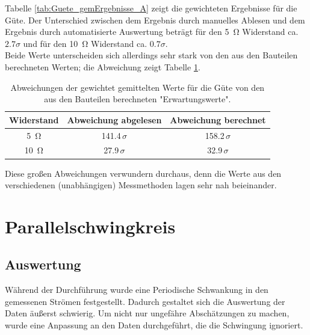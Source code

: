 \documentclass[12pt,a4paper]{article}
\begin{document}
Tabelle \ref{tab:Guete_gemErgebnisse_A} zeigt die gewichteten Ergebnisse für die Güte. Der Unterschied zwischen dem Ergebnis durch manuelles Ablesen und dem Ergebnis durch automatisierte Auswertung beträgt für den \SI{5}{\ohm} Widerstand ca. $2.7 \sigma$ und für den \SI{10}{\ohm} Widerstand ca. $0.7 \sigma$.\\
Beide Werte unterscheiden sich allerdings sehr stark von den aus den Bauteilen berechneten Werten; die Abweichung zeigt Tabelle \ref{tab:Guete_Abweichungen_A}.

\begin{table}
\begin{center}
\begin{tabular}{|c|c|c|}
\hline 
Widerstand & Abweichung abgelesen & Abweichung berechnet \\ 
\hline 
\SI{5}{\ohm} & 141.4$\, \sigma$ & 158.2$\, \sigma$ \\ 
\hline 
\SI{10}{\ohm} & 27.9$\, \sigma$ & 32.9$\, \sigma$ \\ 
\hline 
\end{tabular} 
\caption{Abweichungen der gewichtet gemittelten Werte für die Güte von den aus den Bauteilen berechneten "Erwartungswerte".}
\label{tab:Guete_Abweichungen_A}
\end{center}
\end{table}

Diese großen Abweichungen verwundern durchaus, denn die Werte aus den verschiedenen (unabhängigen) Messmethoden lagen sehr nah beieinander.


\newpage
\section{Parallelschwingkreis}

\subsection{Auswertung}
Während der Durchführung wurde eine Periodische Schwankung in den gemessenen Strömen festgestellt. Dadurch gestaltet sich die Auswertung der Daten äußerst schwierig. Um nicht nur ungefähre Abschätzungen zu machen, wurde eine Anpassung an den Daten durchgeführt, die die Schwingung ignoriert.
\end{document}
